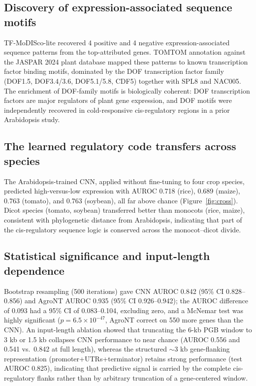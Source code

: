 \documentclass[11pt,a4paper]{article}
\begin{document}
\subsection{Discovery of expression-associated sequence motifs}
TF-MoDISco-lite recovered 4 positive and 4 negative expression-associated sequence patterns from the top-attributed genes. TOMTOM annotation against the JASPAR 2024 plant database mapped these patterns to known transcription factor binding motifs, dominated by the DOF transcription factor family (DOF1.5, DOF3.4/3.6, DOF5.1/5.8, CDF5) together with SPL8 and NAC005. The enrichment of DOF-family motifs is biologically coherent: DOF transcription factors are major regulators of plant gene expression, and DOF motifs were independently recovered in cold-responsive cis-regulatory regions in a prior Arabidopsis study.

\subsection{The learned regulatory code transfers across species}
The Arabidopsis-trained CNN, applied without fine-tuning to four crop species, predicted high-versus-low expression with AUROC 0.718 (rice), 0.689 (maize), 0.763 (tomato), and 0.763 (soybean), all far above chance (Figure~\ref{fig:cross}). Dicot species (tomato, soybean) transferred better than monocots (rice, maize), consistent with phylogenetic distance from Arabidopsis, indicating that part of the cis-regulatory sequence logic is conserved across the monocot--dicot divide.

\subsection{Statistical significance and input-length dependence}
Bootstrap resampling (500 iterations) gave CNN AUROC 0.842 (95\% CI 0.828--0.856) and AgroNT AUROC 0.935 (95\% CI 0.926--0.942); the AUROC difference of 0.093 had a 95\% CI of 0.083--0.104, excluding zero, and a McNemar test was highly significant ($p = 6.5\times10^{-47}$, AgroNT correct on 550 more genes than the CNN). An input-length ablation showed that truncating the 6-kb PGB window to 3 kb or 1.5 kb collapses CNN performance to near chance (AUROC 0.556 and 0.541 vs.\ 0.842 at full length), whereas the structured $\sim$3 kb gene-flanking representation (promoter+UTRs+terminator) retains strong performance (test AUROC 0.825), indicating that predictive signal is carried by the complete cis-regulatory flanks rather than by arbitrary truncation of a gene-centered window.
\end{document}
